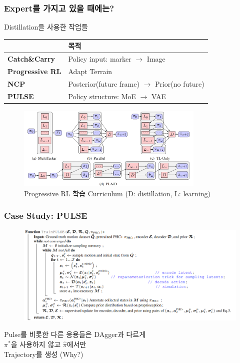 \documentclass[11pt,xcolor={dvipsnames},hyperref={pdftex,pdfpagemode=UseNone,hidelinks,pdfdisplaydoctitle=true},usepdftitle=false]{beamer}
\begin{document}
\begin{frame}
    \frametitle{Expert를 가지고 있을 때에는?}
    Distillation을 사용한 작업들

    \begin{table}
        \centering
        \begin{tabular}{|>{\small}l|>{\small}l|}
            \hline
            \rowcolor{lightgray} %
            & \textbf{목적} \\
            \hline
            \textbf{Catch\&Carry} & Policy input: \: marker $\to$ Image \\
            \hline
            \textbf{Progressive RL} & Adapt Terrain \\
            \hline
            \textbf{NCP} & Posterior(future frame) $\to$ Prior(no future) \\
            \hline
            \textbf{PULSE} & Policy structure: \: MoE $\to$ VAE \\
            \hline
        \end{tabular}
    \end{table}    

    \begin{figure}
        \centering
        \includegraphics[width=0.8\textwidth]{figs/progressive.png}
        \caption{Progressive RL 학습 Curriculum {\footnotesize (D: distillation, L: learning)}}
    \end{figure}    
\end{frame}

\begin{frame}
    \frametitle{Case Study: PULSE}
\begin{figure}
    \includegraphics[width=\textwidth]{figs/pulse_alg.png}
\end{figure}

Pulse를 비롯한 다른 응용들은 DAgger과 다르게 \\ 
$\pi^*$을 사용하지 않고 $\hat{\pi}$에서만 \\
Trajectory를 생성 (Why?)

\end{frame}
\end{document}
